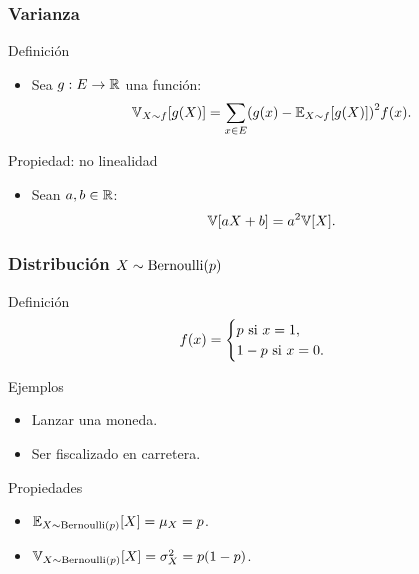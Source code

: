 \documentclass[table]{beamer}
\begin{document}
\begin{frame}
    \frametitle{Varianza}
    \begin{block}{Definición}
        \begin{itemize}
            \item Sea $g : E \rightarrow \mathbb{R}$ una función:
                \begin{equation*}
                    \variancedist{X \sim f}{g \parens{X}} = \sum_{x \in E} \parens{g \parens{x} - \expecteddist{X \sim f}{g \parens{X}}}^{2} \ff{x} .
                \end{equation*}
        \end{itemize}
    \end{block}
    \begin{block}{Propiedad: no linealidad}
        \begin{itemize}
            \item Sean $a, b \in \mathbb{R}$:
                \begin{equation*}
                    \variance{a X + b} = a^{2} \variance{X} .
                \end{equation*}
        \end{itemize}
    \end{block}
\end{frame}

\begin{frame}
    \frametitle{Distribución $X \sim \bernoulli{p}$}
    \begin{block}{Definición}
            \begin{equation*}
                \ff{x} = \begin{cases} p \text{ si } x = 1, \\ 1 - p \text{ si } x = 0. \end{cases}
            \end{equation*}
    \end{block}
    \begin{exampleblock}{Ejemplos}
        \begin{itemize}
            \item Lanzar una moneda.
            \item Ser fiscalizado en carretera.
        \end{itemize}
    \end{exampleblock}
    \begin{block}{Propiedades}
        \begin{itemize}
            \item $\expecteddist{X \sim \bernoulli{p}}{X} = \mu_{X} = p$.
            \item $\variancedist{X \sim \bernoulli{p}}{X} = \sigma^{2}_{X} = p \parens{1 - p}$.
        \end{itemize}
    \end{block}
\end{frame}
\end{document}
